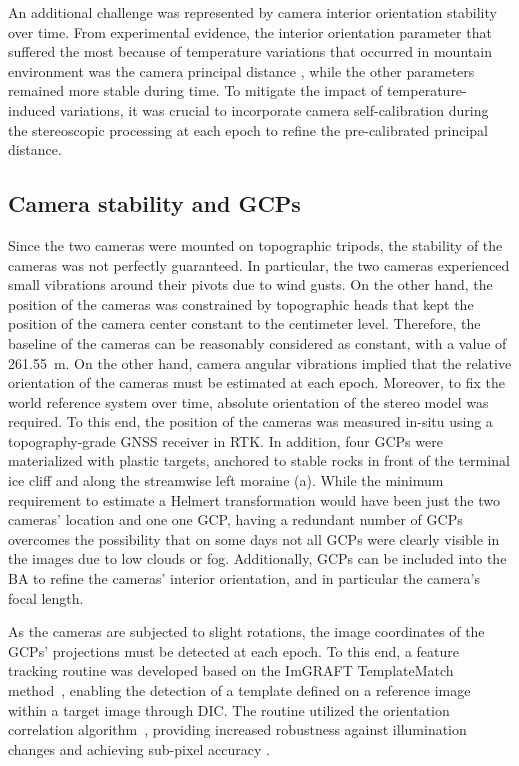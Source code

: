 An additional challenge was represented by camera interior orientation stability over
time.
From experimental evidence, the interior orientation parameter that suffered the most
because of temperature variations that occurred in mountain environment
was the camera principal distance \citep{Elias2020}, while the other parameters
remained more stable during time.
To mitigate the impact of temperature-induced variations, it was crucial to incorporate
camera self-calibration during the stereoscopic processing at each epoch to refine the
pre-calibrated principal distance.

\subsection{Camera stability and GCPs}\label{sec:4:stability}

Since the two cameras were mounted on topographic tripods, the stability of the cameras
was not perfectly guaranteed. In particular, the two cameras experienced small vibrations
around their pivots due to wind gusts.
On the other hand, the position of the cameras was constrained by topographic heads that
kept the position of the camera center constant to the centimeter level.
Therefore, the baseline of the cameras can be reasonably considered as constant, with a
value of \SI{261.55}{\meter}.
On the other hand, camera angular vibrations implied that the relative orientation of the
cameras must be estimated at each epoch.
Moreover, to fix the world reference system over time, absolute orientation of the
stereo model was required.
To this end, the position of the cameras was measured in-situ using a topography-grade
GNSS receiver in RTK.
In addition, four GCPs were materialized with plastic targets, anchored to stable rocks
in front of the terminal ice cliff and along the streamwise left
moraine (a).
While the minimum requirement to estimate a Helmert transformation would have been just
the two cameras' location and one one GCP, having a redundant number of GCPs overcomes
the
possibility that on some days not all GCPs were clearly visible in the images due to low
clouds or fog.
Additionally, GCPs can be included into the BA to refine the cameras' interior
orientation,
and in particular the camera's focal length.

As the cameras are subjected to slight rotations, the image coordinates of the GCPs'
projections must be detected at each epoch.
To this end, a feature tracking routine was developed based on the ImGRAFT TemplateMatch
method~\citep{Messerli2015}, enabling the detection of a template defined on a reference
image within a target image through DIC.
The routine utilized the orientation correlation algorithm~\citep{fitch2002_OC},
providing increased
robustness against illumination changes and achieving sub-pixel accuracy
\citep{Dematteis2021,Heid2012_evaluation_xcorr}.

